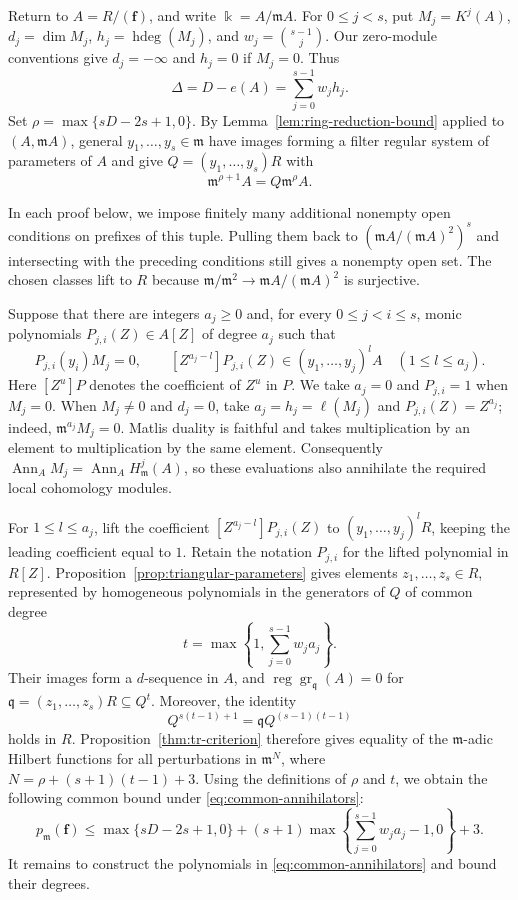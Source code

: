 \documentclass[11pt,reqno]{amsart}
\numberwithin{equation}{section}
\theoremstyle{definition}
\newcommand{\m}{\mathfrak m}
\newcommand{\q}{\mathfrak q}
\newcommand{\f}{\mathbf f}
\newcommand{\hdeg}{\operatorname{hdeg}}
\newcommand{\Ann}{\operatorname{Ann}}
\begin{document}
Return to $A=R/(\f)$, and write $\Bbbk=A/\m A$.
For $0\le j<s$, put $M_j=K^j(A)$, $d_j=\dim M_j$,
$h_j=\hdeg(M_j)$, and $w_j=\binom{s-1}{j}$.
Our zero-module conventions give $d_j=-\infty$ and $h_j=0$ if $M_j=0$.
Thus
\begin{equation}\label{eq:delta-sum}
 \Delta=D-e(A)=\sum_{j=0}^{s-1}w_jh_j.
\end{equation}
Set $\rho=\max\{sD-2s+1,0\}$. By Lemma~\ref{lem:ring-reduction-bound}
applied to $(A,\m A)$, general
$y_1,\ldots,y_s\in\m$ have images forming a filter regular
system of parameters of $A$ and give $Q=(y_1,\ldots,y_s)R$ with
\begin{equation}\label{eq:main-rho}
 \m^{\rho+1}A=Q\m^\rho A.
\end{equation}

In each proof below, we impose finitely many additional nonempty open
conditions on prefixes of this tuple. Pulling them back to
$(\m A/(\m A)^2)^s$ and intersecting with the preceding conditions
still gives a nonempty open set.
The chosen classes lift to $R$ because
$\m/\m^2\to\m A/(\m A)^2$ is surjective.

Suppose that there are integers $a_j\ge0$ and, for every
$0\le j<i\le s$, monic polynomials $P_{j,i}(Z)\in A[Z]$ of degree
$a_j$ such that
\begin{equation}\label{eq:common-annihilators}
 P_{j,i}(y_i)M_j=0,\qquad
 [Z^{a_j-l}]P_{j,i}(Z)\in(y_1,\ldots,y_j)^lA
 \quad(1\le l\le a_j).
\end{equation}
Here $[Z^u]P$ denotes the coefficient of $Z^u$ in $P$.
We take $a_j=0$ and $P_{j,i}=1$ when $M_j=0$.
When $M_j\ne0$ and $d_j=0$, take $a_j=h_j=\ell(M_j)$ and
$P_{j,i}(Z)=Z^{a_j}$; indeed, $\m^{a_j}M_j=0$.
Matlis duality is faithful and takes multiplication by an element
to multiplication by the same element. Consequently
$\Ann_A M_j=\Ann_A H^j_{\m}(A)$, so these evaluations also
annihilate the required local cohomology modules.

For $1\le l\le a_j$, lift the coefficient
$[Z^{a_j-l}]P_{j,i}(Z)$ to $(y_1,\ldots,y_j)^lR$,
keeping the leading coefficient equal to $1$.
Retain the notation $P_{j,i}$ for the lifted polynomial in $R[Z]$.
Proposition~\ref{prop:triangular-parameters}
gives elements $z_1,\ldots,z_s\in R$, represented by homogeneous
polynomials in the generators of $Q$ of common degree
\[
 t=\max\left\{1,\sum_{j=0}^{s-1}w_ja_j\right\}.
\]
Their images form a $d$-sequence in $A$, and
$\operatorname{reg}\operatorname{gr}_{\q}(A)=0$ for
$\q=(z_1,\ldots,z_s)R\subseteq Q^t$. Moreover, the identity
\[
 Q^{s(t-1)+1}=\q Q^{(s-1)(t-1)}
\]
holds in $R$. Proposition~\ref{thm:tr-criterion}
therefore gives equality of the $\mathfrak m$-adic Hilbert functions
for all perturbations in $\m^N$, where
$N=\rho+(s+1)(t-1)+3$.
Using the definitions of $\rho$ and $t$, we obtain
the following common bound under \eqref{eq:common-annihilators}:
\begin{equation}\label{eq:common-perturbation-bound}
 p_{\m}(\f)\le
 \max\{sD-2s+1,0\}
 +(s+1)\max\left\{\sum_{j=0}^{s-1}w_ja_j-1,0\right\}+3.
\end{equation}
It remains to construct the polynomials in
\eqref{eq:common-annihilators} and bound their degrees.
\end{document}

